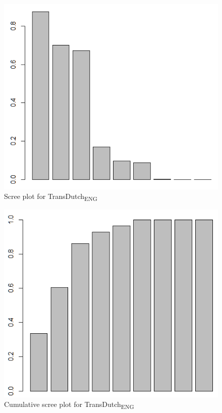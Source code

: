 \begin{figure}
\includegraphics[height=.4\textheight]{figures/Vandevoorde2-img63.png}
\caption{\label{fig:4:62}Scree plot for TransDutch\textsubscript{ENG}}
\end{figure}

\begin{figure}
\includegraphics[height=.4\textheight]{figures/Vandevoorde2-img64.png}
\caption{\label{fig:4:63}Cumulative scree plot for TransDutch\textsubscript{ENG}}
\end{figure}


